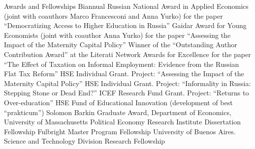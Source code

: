 
\def\arraystretch{1.3}

\begin{rubric}{Awards and Fellowships}
 Biannual Russian National Award in Applied Economics (joint with coauthors Marco Francesconi and Anna Yurko) for the paper ``Democratizing Access to Higher Education in Russia''
 Gaidar Award for Young Economists (joint with coauthor Anna Yurko) for the paper ``Assessing the Impact of the Maternity Capital Policy''
 Winner of the ``Outstanding Author Contribution Award'' at the Literati Network Awards for Excellence for the paper ``The Effect of Taxation on Informal Employment: Evidence from the Russian Flat Tax Reform''
 HSE Individual Grant. Project: ``Assessing the Impact of the Maternity Capital Policy''
 HSE Individual Grant. Project: ``Informality in Russia: Stepping Stone or Dead End?''
 ICEF Research Fund Grant. Project: ``Returns to Over-education''
 HSE Fund of Educational Innovation (development of best ``prakticum'')
 Solomon Barkin Graduate Award, Department of Economics, University of Massachusetts
 Political Economy Research Institute Dissertation Fellowship
 Fulbright Master Program Fellowship
 University of Buenos Aires. Science and Technology Division Research Fellowship
\end{rubric}
